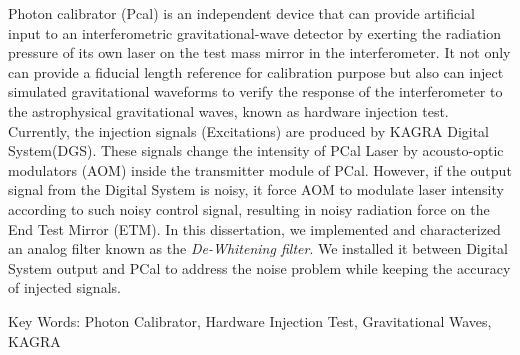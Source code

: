 Photon calibrator (Pcal) is an independent device that can provide artificial input to an interferometric gravitational-wave detector by exerting the radiation pressure of its own laser on the test mass mirror in the interferometer. It not only can provide a fiducial length reference for calibration purpose but also can inject simulated gravitational waveforms to verify the response of the interferometer to the astrophysical gravitational waves, known as hardware injection test. 
Currently, the injection signals (Excitations) are produced by KAGRA Digital System(DGS). These signals change the intensity of PCal Laser by acousto-optic modulators (AOM) inside the transmitter module of PCal. However, if the output signal from the Digital System is noisy, it force AOM to modulate laser intensity according to such noisy control signal, resulting in noisy radiation force on the End Test Mirror (ETM). In this dissertation, we implemented and characterized an analog filter known as the \emph{De-Whitening filter}. We installed it between Digital System output and PCal to address the noise problem while keeping the accuracy of injected signals.




Key Words: Photon Calibrator, Hardware Injection Test, Gravitational Waves, KAGRA

%
%
%
%
%
